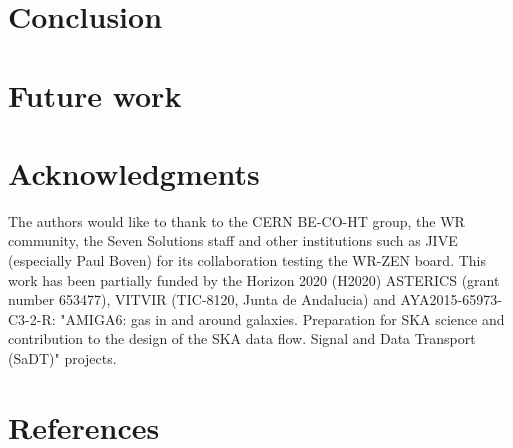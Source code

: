 \documentclass[review]{elsarticle}
\begin{document}
\section{Conclusion}

\section{Future work}

\section{Acknowledgments}

The authors would like to thank to the CERN BE-CO-HT group, the WR community, the Seven Solutions staff and
other institutions such as JIVE (especially Paul Boven) for its collaboration testing the
WR-ZEN board. This work has been partially funded by the Horizon 2020 (H2020) ASTERICS (grant number 653477),
VITVIR (TIC-8120, Junta de Andalucia) and AYA2015-65973-C3-2-R: "AMIGA6: gas in and around galaxies. Preparation for SKA science and contribution to the design of the SKA data flow. Signal and Data Transport (SaDT)" projects.

\section*{References}


\end{document}
